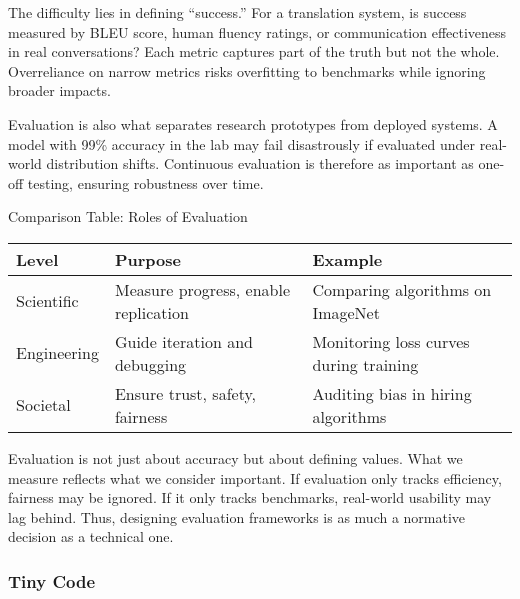 \documentclass[
  letterpaper,
  DIV=11,
  numbers=noendperiod]{scrreprt}
\begin{document}
The difficulty lies in defining ``success.'' For a translation system,
is success measured by BLEU score, human fluency ratings, or
communication effectiveness in real conversations? Each metric captures
part of the truth but not the whole. Overreliance on narrow metrics
risks overfitting to benchmarks while ignoring broader impacts.

Evaluation is also what separates research prototypes from deployed
systems. A model with 99\% accuracy in the lab may fail disastrously if
evaluated under real-world distribution shifts. Continuous evaluation is
therefore as important as one-off testing, ensuring robustness over
time.

Comparison Table: Roles of Evaluation

\begin{longtable}[]{@{}
  >{\raggedright\arraybackslash}p{}
  >{\raggedright\arraybackslash}p{}
  >{\raggedright\arraybackslash}p{}@{}}
\toprule\noalign{}
\begin{minipage}[b]{\linewidth}\raggedright
Level
\end{minipage} & \begin{minipage}[b]{\linewidth}\raggedright
Purpose
\end{minipage} & \begin{minipage}[b]{\linewidth}\raggedright
Example
\end{minipage} \\
\midrule\noalign{}
\endhead
\bottomrule\noalign{}
\endlastfoot
Scientific & Measure progress, enable replication & Comparing algorithms
on ImageNet \\
Engineering & Guide iteration and debugging & Monitoring loss curves
during training \\
Societal & Ensure trust, safety, fairness & Auditing bias in hiring
algorithms \\
\end{longtable}

Evaluation is not just about accuracy but about defining values. What we
measure reflects what we consider important. If evaluation only tracks
efficiency, fairness may be ignored. If it only tracks benchmarks,
real-world usability may lag behind. Thus, designing evaluation
frameworks is as much a normative decision as a technical one.

\subsubsection{Tiny Code}\label{tiny-code-80}
\end{document}
